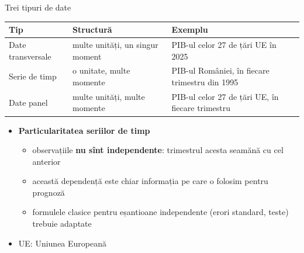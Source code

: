\begin{frame}{Trei tipuri de date}
\itemsize{\footnotesize}
\begin{center}
\footnotesize
\begin{tabular}{>{\raggedright\arraybackslash}p{2.6cm}>{\raggedright\arraybackslash}p{4.2cm}>{\raggedright\arraybackslash}p{5.4cm}}
\toprule
\textbf{Tip} & \textbf{Structură} & \textbf{Exemplu} \\
\midrule
Date transversale & multe unități, un singur moment & PIB-ul celor 27 de țări UE în 2025 \\
Serie de timp & o unitate, multe momente & PIB-ul României, în fiecare trimestru din 1995 \\
Date panel & multe unități, multe momente & PIB-ul celor 27 de țări UE, în fiecare trimestru \\
\bottomrule
\end{tabular}
\end{center}
\begin{itemize}
    \item \textbf{Particularitatea seriilor de timp}
    \begin{itemize}
        \item observațiile \textbf{nu sînt independente}: trimestrul acesta seamănă cu cel anterior
        \item această dependență este chiar informația pe care o folosim pentru prognoză
        \item formulele clasice pentru eșantioane independente (erori standard, teste) trebuie adaptate
    \end{itemize}
    \item UE: Uniunea Europeană
\end{itemize}
\end{frame}

